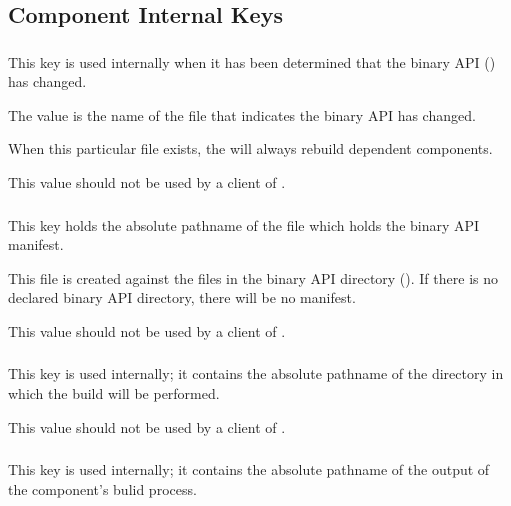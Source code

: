 \subsection{Component Internal Keys}

\subsubsection{}

This key is used internally when it has been determined that the
binary API () has changed.

The value is the name of the file that indicates the binary API has
changed.

When this particular file exists, the \lmsbw will always rebuild
dependent components.

This value should not be used by a client of \lmsbw.

\subsubsection{}

This key holds the absolute pathname of the file which holds the
binary API \mtree manifest.

This file is created against the files in the binary API directory
().  If there is no declared binary API
directory, there will be no manifest.

This value should not be used by a client of \lmsbw.

\subsubsection{}

This key is used internally; it contains the absolute pathname of the
directory in which the build will be performed.

This value should not be used by a client of \lmsbw.

\subsubsection{}

This key is used internally; it contains the absolute pathname of the
output of the component's bulid process.

